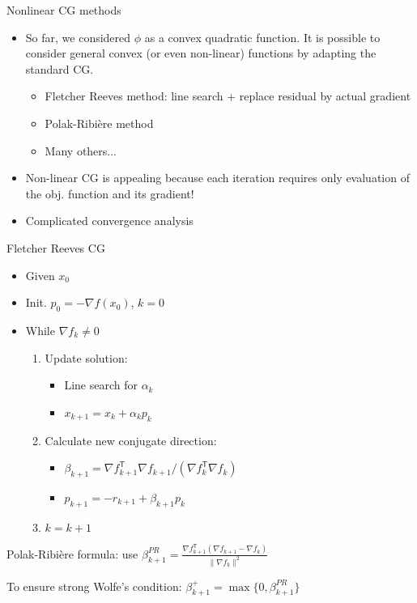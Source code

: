 \documentclass{beamer}
\newcommand{\tran}{\mathsf{T}}
\begin{document}
\begin{frame}[allowframebreaks]{Nonlinear CG methods}

	\begin{itemize}
		
		\item So far, we considered $\phi$ as a convex quadratic function. It is possible to consider general convex (or even non-linear) functions by adapting the standard CG.
	
		\begin{itemize}
			\item Fletcher Reeves method: line search + replace residual by actual gradient
			\item Polak-Ribière method
			\item Many others...
		\end{itemize}
	
		\item Non-linear CG is appealing because each iteration requires only evaluation of the obj. function and its gradient!
	
		\item Complicated convergence analysis
		
	\end{itemize}
\end{frame}

\begin{frame}
	\begin{block}{Fletcher Reeves CG}
	\begin{itemize}
		\item Given $x_0$
		\item Init. $p_0 = -\nabla f(x_0)$, $k=0$
		\item While $\nabla f_k \neq 0$
		\begin{enumerate}
			\item Update solution: 
			\begin{itemize}
				\item Line search for $\alpha_k$
				\item $x_{k+1} = x_k +\alpha_k p_k$
			\end{itemize}
			\item Calculate new conjugate direction:
			\begin{itemize}
				\item $\beta_{k+1} = \nabla f_{k+1}^\tran \nabla f_{k+1}/(\nabla f_k^\tran \nabla f_k)$
				\item $p_{k+1} = -r_{k+1} + \beta_{k+1} p_k$
			\end{itemize}
			\item $k = k+1$
		\end{enumerate}
	\end{itemize}
\end{block}

Polak-Ribière formula: use $\beta_{k+1}^{PR} = \frac{\nabla f_{k+1}^\tran (\nabla f_{k+1} - \nabla f_{k})}{\| \nabla f_k \|^2}$

To ensure strong Wolfe's condition: $\beta_{k+1}^+ = \max \{0, \beta_{k+1}^{PR}\}$

\end{frame}
 
\end{document}
